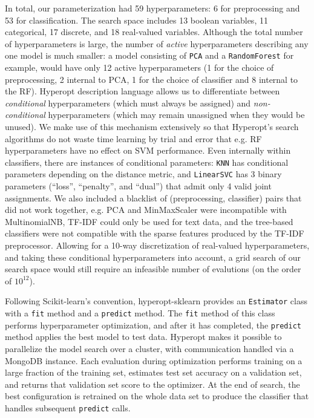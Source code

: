 \documentclass[wcp]{jmlr}
\begin{document}
In total, our parameterization had 59 hyperparameters: 6 for preprocessing and 53 for classification.
The search space includes 13 boolean variables, 11 categorical, 17 discrete, and 18 real-valued variables.
Although the total number of hyperparameters is large, the number of {\em active} hyperparameters describing any one model is much smaller: a model consisting of \texttt{PCA} and a \texttt{RandomForest} for example,
would have only 12 active hyperparameters (1 for the choice of preprocessing, 2 internal to PCA, 1 for the choice of classifier and 8 internal to the RF).
Hyperopt description language allows us to differentiate between {\em conditional} hyperparameters (which must always be assigned) and {\em non-conditional} hyperparameters (which may remain unassigned when they would be unused).
We make use of this mechanism extensively so that Hyperopt's search algorithms do not waste time learning by trial and error that e.g. RF hyperparameters have no effect on SVM performance.
Even internally within classifiers, there are instances of conditional parameters: \texttt{KNN} has conditional parameters depending on the distance metric,
and \texttt{LinearSVC} has 3 binary parameters (``loss'', ``penalty'', and ``dual'') that admit only 4 valid joint assignments.
We also included a blacklist of (preprocessing, classifier) pairs that did not work together, e.g. PCA and MinMaxScaler were incompatible with MultinomialNB, TF-IDF could only be used for text data, and the tree-based classifiers were not
compatible with the sparse features produced by the TF-IDF preprocessor.
Allowing for a 10-way discretization of real-valued hyperparameters, and taking these conditional hyperparameters into account, a grid search of our search space would still require an infeasible number of evalutions (on the order of $10^{12}$).

Following Scikit-learn's convention, hyperopt-sklearn provides an \texttt{Estimator} class with a \texttt{fit} method and a \texttt{predict} method.
The \texttt{fit} method of this class performs hyperparameter optimization, and after it has completed, the \texttt{predict} method applies the best model to test data.
Hyperopt makes it possible to parallelize the model search over a cluster, with communication handled via a MongoDB instance.
Each evaluation during optimization performs training on a large fraction of the training set, estimates test set accuracy on a validation set, and returns that validation set score to the optimizer.
At the end of search, the best configuration is retrained on the whole data set to produce the classifier that handles subsequent \texttt{predict} calls.
\end{document}
